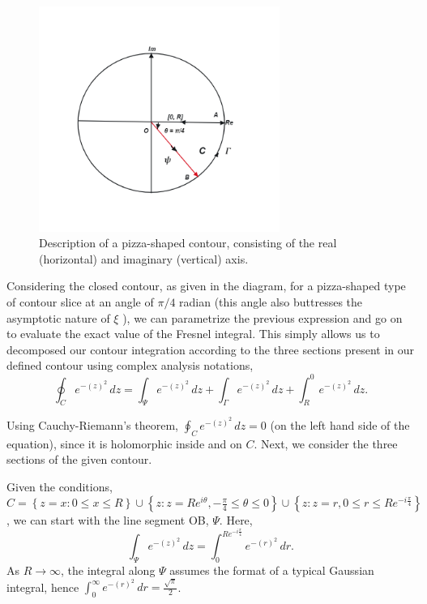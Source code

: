 \documentclass[conference]{IEEEtran}
\begin{document}
\begin{figure}[h] 
\centering
\includegraphics[width=0.7\textwidth]{COUNTOUR_INTEGRATION_DIAGRAM.png}
\caption{ Description of a pizza-shaped contour, consisting of the real (horizontal) and imaginary (vertical) axis.} \label{fig:my_label}
\end{figure}

Considering the closed contour, as given in the diagram, for a pizza-shaped type of contour slice at an angle of $\pi/4$ radian (this angle also buttresses the asymptotic nature of $\xi$ \cite{Tiscareno_2007}), we can parametrize the previous expression and go on to evaluate the exact value of the Fresnel integral. This simply allows us to decomposed our contour integration according to the three sections present in our defined contour using complex analysis notations,
\begin{equation}
    \oint_{C} e^{-(z)^{2}} \, dz = \int_{\Psi} e^{-(z)^{2}} \, dz + \int_{\Gamma} e^{-(z)^{2}} \, dz + \int_{R}^{0} e^{-(z)^{2}} \, dz.
\end{equation}


Using Cauchy-Riemann's theorem, $\oint_{C} e^{-(z)^{2}} \, dz = 0$ (on the left hand side of the equation), since it is holomorphic inside and on $C$. Next, we consider the three sections of the given contour.

Given the conditions, $C = \left\{ z = x : 0 \leq x \leq R \right\} \cup \left\{ z : z = Re^{i\theta}, -\frac{\pi}{4} \leq \theta \leq 0 \right\} \cup \left\{ z : z = r,  0 \leq r \leq Re^{-i\frac{\pi}{4}}\right\}$, we can start with the line segment OB, $\Psi$. Here, 
\begin{equation}
    \int_{\Psi} e^{-(z)^{2}} \, dz = \int_{0}^{Re^{-i\frac{\pi}{4}}} e^{-(r)^{2}} \, dr.
\end{equation}
As $R \rightarrow \infty$, the integral along $\Psi$ assumes the format of a typical Gaussian integral, hence $\int_{0}^{\infty} e^{-(r)^{2}}\, dr = \frac{\sqrt{\pi}}{2}$.
\end{document}

